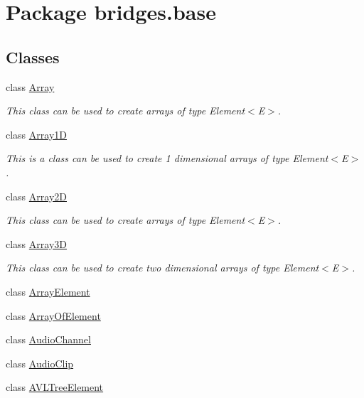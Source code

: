 \hypertarget{namespacebridges_1_1base}{}\section{Package bridges.\+base}
\label{namespacebridges_1_1base}
\subsection*{Classes}
\begin{DoxyCompactItemize}
\item 
class \hyperlink{classbridges_1_1base_1_1_array}{Array}
\begin{DoxyCompactList}\small\item\em This class can be used to create arrays of type Element$<$\+E$>$. \end{DoxyCompactList}\item 
class \hyperlink{classbridges_1_1base_1_1_array1_d}{Array1D}
\begin{DoxyCompactList}\small\item\em This is a class can be used to create 1 dimensional arrays of type Element$<$\+E$>$. \end{DoxyCompactList}\item 
class \hyperlink{classbridges_1_1base_1_1_array2_d}{Array2D}
\begin{DoxyCompactList}\small\item\em This class can be used to create arrays of type Element$<$\+E$>$. \end{DoxyCompactList}\item 
class \hyperlink{classbridges_1_1base_1_1_array3_d}{Array3D}
\begin{DoxyCompactList}\small\item\em This class can be used to create two dimensional arrays of type Element$<$\+E$>$. \end{DoxyCompactList}\item 
class \hyperlink{classbridges_1_1base_1_1_array_element}{Array\+Element}
\item 
class \hyperlink{classbridges_1_1base_1_1_array_of_element}{Array\+Of\+Element}
\item 
class \hyperlink{classbridges_1_1base_1_1_audio_channel}{Audio\+Channel}
\item 
class \hyperlink{classbridges_1_1base_1_1_audio_clip}{Audio\+Clip}
\item 
class \hyperlink{classbridges_1_1base_1_1_a_v_l_tree_element}{A\+V\+L\+Tree\+Element}

\end{DoxyCompactItemize}
